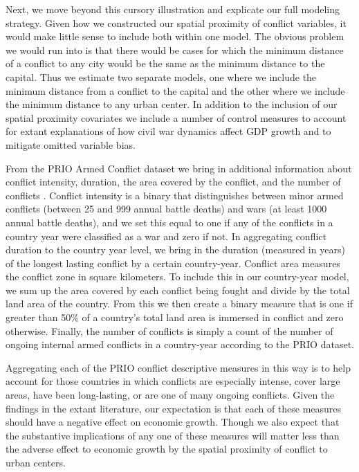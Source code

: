 Next, we move beyond this cursory illustration and explicate our full modeling strategy. Given how we constructed our spatial proximity of conflict variables, it would make little sense to include both within one model. The obvious problem we would run into is that there would be cases for which the minimum distance of a conflict to any city would be the same as the minimum distance to the capital. Thus we estimate two separate models, one where we include the minimum distance from a conflict to the capital and the other where we include the minimum distance to any urban center. In addition to the inclusion of our spatial proximity covariates we include a number of control measures to account for extant explanations of how civil war dynamics affect GDP growth and to mitigate omitted variable bias. 

From the PRIO Armed Conflict dataset we bring in additional information about conflict intensity, duration, the area covered by the conflict, and the number of conflicts \citep{themner:wallensteen:2014}. Conflict intensity is a binary that distinguishes between minor armed conflicts (between 25 and 999 annual battle deaths) and wars (at least 1000 annual battle deaths), and we set this equal to one if any of the conflicts in a country year were classified as a war and zero if not. In aggregating conflict duration to the country year level, we bring in the duration (measured in years) of the longest lasting conflict by a certain country-year. Conflict area measures the conflict zone in square kilometers. To include this in our country-year model, we sum up the area covered by each conflict being fought and divide by the total land area of the country. From this we then create a binary measure that is one if greater than 50\% of a country's total land area is immersed in conflict and zero otherwise. Finally, the number of conflicts is simply a count of the number of ongoing internal armed conflicts in a country-year according to the PRIO dataset.

Aggregating each of the PRIO conflict descriptive measures in this way is to help account for those countries in which conflicts are especially intense, cover large areas, have been long-lasting, or are one of many ongoing conflicts. Given the findings in the extant literature, our expectation is that each of these measures should have a negative effect on economic growth. Though we also expect that the substantive implications of any one of these measures will matter less than the adverse effect to economic growth by the spatial proximity of conflict to urban centers.

